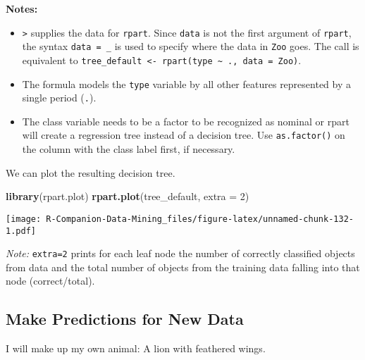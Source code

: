\documentclass[
  notitlepage]{book}
\newenvironment{Shaded}{\begin{snugshade}}{\end{snugshade}}
\newcommand{\DataTypeTok}[1]{\textcolor[rgb]{0.13,0.29,0.53}{#1}}
\newcommand{\DecValTok}[1]{\textcolor[rgb]{0.00,0.00,0.81}{#1}}
\newcommand{\KeywordTok}[1]{\textcolor[rgb]{0.13,0.29,0.53}{\textbf{#1}}}
\newcommand{\NormalTok}[1]{#1}
\providecommand{\tightlist}{%
  \setlength{\itemsep}{0pt}\setlength{\parskip}{0pt}}
\begin{document}
\textbf{Notes:}

\begin{itemize}
\tightlist
\item
  \texttt{\textbar{}\textgreater{}} supplies the data for \texttt{rpart}. Since \texttt{data} is not
  the first argument of \texttt{rpart}, the syntax \texttt{data\ =\ \_} is used to specify
  where the data in \texttt{Zoo} goes. The call is equivalent to
  \texttt{tree\_default\ \textless{}-\ rpart(type\ \textasciitilde{}\ .,\ data\ =\ Zoo)}.
\item
  The formula models the \texttt{type} variable by all other features represented by
  a single period (\texttt{.}).
\item
  The class variable needs to be a factor to be recognized as nominal
  or rpart will create a regression tree instead of a decision tree.
  Use \texttt{as.factor()} on the column with the class label first, if necessary.
\end{itemize}

We can plot the resulting decision tree.

\begin{Shaded}
\begin{Highlighting}[]
\KeywordTok{library}\NormalTok{(rpart.plot)}
\KeywordTok{rpart.plot}\NormalTok{(tree\_default, }\DataTypeTok{extra =} \DecValTok{2}\NormalTok{)}
\end{Highlighting}
\end{Shaded}

\texttt{[image: R-Companion-Data-Mining\_files/figure-latex/unnamed-chunk-132-1.pdf]}

\emph{Note:} \texttt{extra=2} prints for each leaf node the number of correctly
classified objects from data and the total number of objects from the
training data falling into that node (correct/total).

\hypertarget{make-predictions-for-new-data}{%
\subsection{Make Predictions for New Data}\label{make-predictions-for-new-data}}

I will make up my own animal: A lion with feathered wings.
\end{document}
